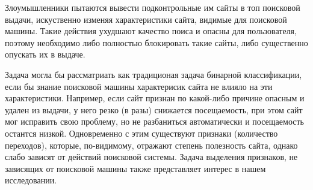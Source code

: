 



Злоумышленники пытаются вывести подконтрольные им сайты в топ поисковой выдачи, искуственно изменяя характеристики сайта, видимые для поисковой машины. Такие действия ухудшают качество поиса и опасны для пользователя, поэтому необходимо либо полностью блокировать такие сайты, либо существенно опускать их в выдаче.

Задача могла бы рассматриать как традиционая задача бинарной классификации, если бы знание поисковой машины характерисик сайта не влияло на эти характеристики. Например, если сайт признан по какой-либо причине опасным и удален из выдачи, у него резко (в разы) снижается посещаемость, при этом сайт мог исправить свою проблему, но не разбаниться автоматически и посещаемость остантся низкой. Одновременно с этим существуют признаки (количество переходов), которые, по-видимому, отражают степень полезность сайта, однако слабо зависят от действий поисковой системы. Задача выделения признаков, не зависящих от поисковой машины также представляет интерес в нашем исследовании.

